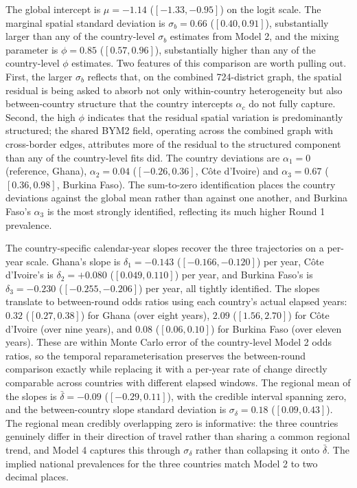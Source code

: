 \documentclass{article}
\begin{document}
The global intercept is \(\mu = -1.14\) (\([-1.33, -0.95]\)) on the
logit scale. The marginal spatial standard deviation is
\(\sigma_b = 0.66\) (\([0.40, 0.91]\)), substantially larger than any of
the country-level \(\sigma_b\) estimates from Model 2, and the mixing
parameter is \(\phi = 0.85\) (\([0.57, 0.96]\)), substantially higher
than any of the country-level \(\phi\) estimates. Two features of this
comparison are worth pulling out. First, the larger \(\sigma_b\)
reflects that, on the combined 724-district graph, the spatial residual
is being asked to absorb not only within-country heterogeneity but also
between-country structure that the country intercepts \(\alpha_c\) do
not fully capture. Second, the high \(\phi\) indicates that the residual
spatial variation is predominantly structured; the shared BYM2 field,
operating across the combined graph with cross-border edges, attributes
more of the residual to the structured component than any of the
country-level fits did. The country deviations are \(\alpha_1 = 0\)
(reference, Ghana), \(\alpha_2 = 0.04\) (\([-0.26, 0.36]\), Côte
d'Ivoire) and \(\alpha_3 = 0.67\) (\([0.36, 0.98]\), Burkina Faso). The
sum-to-zero identification places the country deviations against the
global mean rather than against one another, and Burkina Faso's
\(\alpha_3\) is the most strongly identified, reflecting its much higher
Round 1 prevalence.

The country-specific calendar-year slopes recover the three trajectories
on a per-year scale. Ghana's slope is \(\delta_1 = -0.143\)
(\([-0.166, -0.120]\)) per year, Côte d'Ivoire's is
\(\delta_2 = +0.080\) (\([0.049, 0.110]\)) per year, and Burkina Faso's
is \(\delta_3 = -0.230\) (\([-0.255, -0.206]\)) per year, all tightly
identified. The slopes translate to between-round odds ratios using each
country's actual elapsed years: \(0.32\) (\([0.27, 0.38]\)) for Ghana
(over eight years), \(2.09\) (\([1.56, 2.70]\)) for Côte d'Ivoire (over
nine years), and \(0.08\) (\([0.06, 0.10]\)) for Burkina Faso (over
eleven years). These are within Monte Carlo error of the country-level
Model 2 odds ratios, so the temporal reparameterisation preserves the
between-round comparison exactly while replacing it with a per-year rate
of change directly comparable across countries with different elapsed
windows. The regional mean of the slopes is \(\bar{\delta} = -0.09\)
(\([-0.29, 0.11]\)), with the credible interval spanning zero, and the
between-country slope standard deviation is \(\sigma_\delta = 0.18\)
(\([0.09, 0.43]\)). The regional mean credibly overlapping zero is
informative: the three countries genuinely differ in their direction of
travel rather than sharing a common regional trend, and Model 4 captures
this through \(\sigma_\delta\) rather than collapsing it onto
\(\bar{\delta}\). The implied national prevalences for the three
countries match Model 2 to two decimal places.
\end{document}
